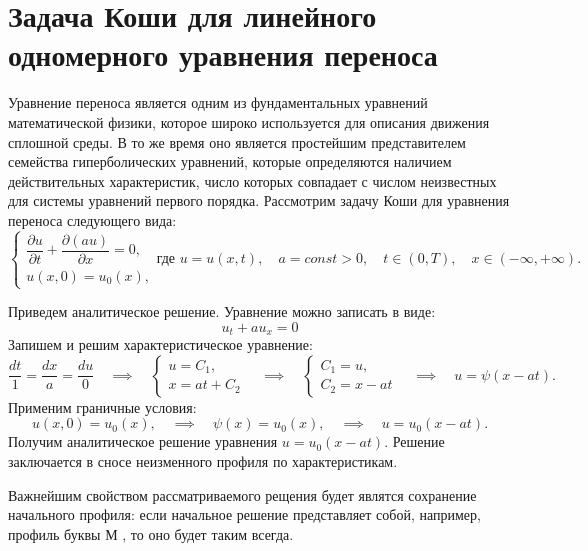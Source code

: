 \documentclass[12pt, a4paper]{article}
\begin{document}
\section{Задача Коши для линейного одномерного уравнения переноса}
Уравнение переноса является одним из фундаментальных уравнений математической физики, которое широко используется для описания движения сплошной среды. В то же время оно является простейшим представителем семейства гиперболических уравнений, которые определяются наличием действительных характеристик, число которых совпадает с числом неизвестных для системы уравнений первого порядка. Рассмотрим задачу Коши для уравнения переноса следующего вида:
\begin{equation}
	\begin{cases}
		\dfrac{\partial u}{\partial t} + \dfrac{\partial (a u)}{\partial x} = 0, \\
		u(x, 0) = u_0(x),
	\end{cases} 
	\text{где } u = u(x, t), \quad a = const > 0, \quad t \in (0, T), \quad x \in (-\infty, +\infty) .
\end{equation}


Приведем аналитическое решение. Уравнение можно записать в виде:
\begin{equation*}
	u_t + a u_x = 0
\end{equation*}
Запишем и решим характеристическое уравнение:
\begin{equation*}
	\dfrac{dt}{1} = \dfrac{dx}{a} = \dfrac{du}{0} \quad \implies  \quad 
	\begin{cases}
		u = C_1,\\
		x = a t + C_2
	\end{cases} 
	\quad \implies \quad
	\begin{cases}
		C_1 = u,\\
		C_2 = x - at
	\end{cases}
	 \quad \implies \quad
	 u = \psi(x-a t).
\end{equation*}
Применим граничные условия:
\begin{equation*}
	u(x, 0) = u_0(x),
	\quad \implies \quad
	\psi(x) = u_0(x),
	 \quad \implies \quad
	 u = u_0(x-a t).
\end{equation*}
Получим аналитическое решение уравнения $u = u_0(x-at)$. Решение заключается в сносе неизменного профиля по характеристикам. 

Важнейшим свойством рассматриваемого рещения будет являтся сохранение начального профиля: если начальное решение представляет собой, например, профиль буквы М , то оно будет таким всегда.
\end{document}
